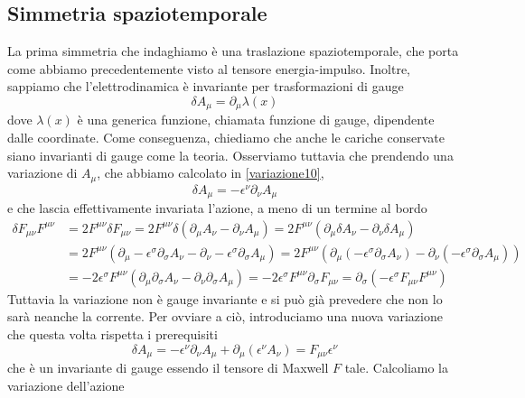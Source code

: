 \subsection{Simmetria spaziotemporale}
    La prima simmetria che indaghiamo è una traslazione spaziotemporale, che porta come abbiamo precedentemente visto al tensore energia-impulso. Inoltre, sappiamo che l'elettrodinamica è invariante per trasformazioni di gauge 
\begin{equation*}
    \delta A_\mu = \partial_\mu \lambda(x)
\end{equation*}
    dove $\lambda(x)$ è una generica funzione, chiamata funzione di gauge, dipendente dalle coordinate. Come conseguenza, chiediamo che anche le cariche conservate siano invarianti di gauge come la teoria. Osserviamo tuttavia che prendendo una variazione di $A_\mu$, che abbiamo calcolato in \eqref{variazione10}, 
\begin{equation*}
    \delta A_\mu = - \epsilon^\nu \partial_\nu A_\mu
\end{equation*}
    e che lascia effettivamente invariata l'azione, a meno di un termine al bordo
\begin{equation*}
\begin{aligned}
    \delta F_{\mu\nu} F^{\mu\nu} & = 2 F^{\mu\nu} \delta F_{\mu\nu} = 2 F^{\mu\nu} \delta (\partial_\mu A_\nu - \partial_\nu A_\mu) = 2 F^{\mu\nu} ( \partial_\mu \delta A_\nu - \partial_\nu \delta A_\mu) \\ & = 2 F^{\mu\nu} ( \partial_\mu - \epsilon^\sigma \partial_\sigma A_\nu - \partial_\nu - \epsilon^\sigma \partial_\sigma A_\mu) = 2 F^{\mu\nu} ( \partial_\mu (- \epsilon^\sigma \partial_\sigma A_\nu) - \partial_\nu (- \epsilon^\sigma \partial_\sigma A_\mu)) \\ & = - 2 \epsilon^\sigma F^{\mu\nu} ( \partial_\mu \partial_\sigma A_\nu - \partial_\nu \partial_\sigma A_\mu) = - 2 \epsilon^\sigma F^{\mu\nu} \partial_\sigma F_{\mu\nu} = \partial_\sigma (-\epsilon^\sigma F_{\mu\nu} F^{\mu\nu})
\end{aligned}
\end{equation*}
    Tuttavia la variazione non è gauge invariante e si può già prevedere che non lo sarà neanche la corrente. Per ovviare a ciò, introduciamo una nuova variazione che questa volta rispetta i prerequisiti 
\begin{equation*}
    \delta A_\mu = - \epsilon^\nu \partial_\nu A_\mu + \partial_\mu (\epsilon^\nu A_\nu) = F_{\mu\nu} \epsilon^\nu
\end{equation*}
    che è un invariante di gauge essendo il tensore di Maxwell $F$ tale. Calcoliamo la variazione dell'azione
